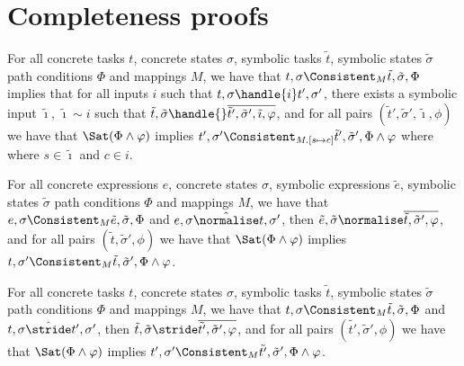 
\section{Completeness proofs}
\label{sec:completenessproofs}

\begin{lemma}
  \label{lem:completeHandle}
  For all concrete tasks $t$, concrete states $\sigma$, symbolic tasks $\tilde{t}$, symbolic states $\tilde{\sigma}$ path conditions $\Phi$ and mappings $M$,
  we have that $t,\sigma\Consistent_{M}\tilde{t},\tilde{\sigma},\Phi$ implies
  that for all inputs $i$ such that $t,\sigma\handle{i}t',\sigma'$,
  there exists a symbolic input $\tilde{\imath}$, $\tilde{\imath}\sim i$ such that
  $\tilde{t},\tilde{\sigma}\handle{}\overline{\tilde{t}',\tilde{\sigma}',\tilde{\imath},\phi}$,
  and for all pairs $(\tilde{t}',\tilde{\sigma}',\tilde{\imath},\phi)$ we have that $\Sat(\Phi\land\phi)$ implies $t',\sigma'\Consistent_{M.[s\mapsto c]}\tilde{t}',\tilde{\sigma}',\Phi\land\phi$ where where $s\in\tilde{\imath}$ and $c\in i$.
\end{lemma}

\begin{lemma}
  \label{lem:completeNormalise}
  For all concrete expressions $e$, concrete states $\sigma$, symbolic expressions $\tilde{e}$, symbolic states $\tilde{\sigma}$ path conditions $\Phi$ and mappings $M$,
  we have that $e,\sigma\Consistent_{M}\tilde{e},\tilde{\sigma},\Phi$
  and $e,\sigma\hat{\normalise} t,\sigma'$,
  then $\tilde{e},\tilde{\sigma}\normalise\overline{\tilde{t},\tilde{\sigma}',\phi}$,
  and for all pairs $(\tilde{t},\tilde{\sigma}',\phi)$ we have that $\Sat(\Phi\land\phi)$ implies $t,\sigma'\Consistent_{M}\tilde{t},\tilde{\sigma}',\Phi\land\phi$.
\end{lemma}

\begin{lemma}
  \label{lem:completeStride}
  For all concrete tasks $t$, concrete states $\sigma$, symbolic tasks $\tilde{t}$, symbolic states $\tilde{\sigma}$ path conditions $\Phi$ and mappings $M$,
  we have that $t,\sigma\Consistent_{M}\tilde{t},\tilde{\sigma},\Phi$
  and $t,\sigma\hat{\stride} t',\sigma'$,
  then $\tilde{t},\tilde{\sigma}\stride\overline{\tilde{t'},\tilde{\sigma}',\phi}$,
  and for all pairs $(\tilde{t'},\tilde{\sigma}',\phi)$ we have that $\Sat(\Phi\land\phi)$ implies $t',\sigma'\Consistent_{M}\tilde{t'},\tilde{\sigma}',\Phi\land\phi$.
\end{lemma}

